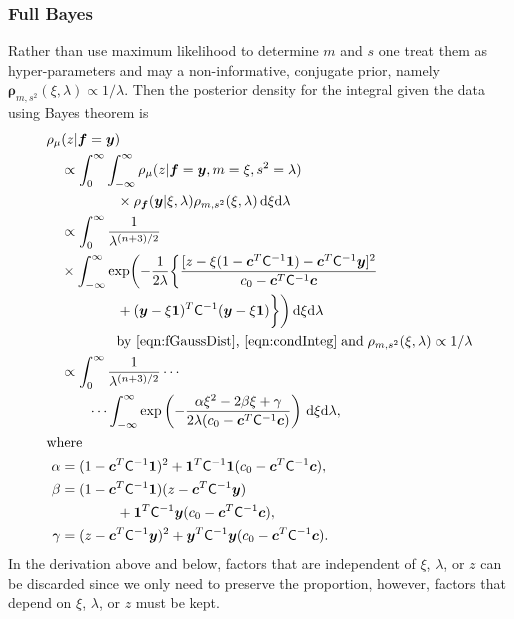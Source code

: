 \documentclass[twocolumn]{svjour3}          %
\newcommand{\bm}[1]{\boldsymbol{#1}}
\newcommand{\D}[1]{\text{d}{#1}}
\newcommand{\vc}{\bm{c}}
\newcommand{\vf}{\bm{f}}
\newcommand{\vrho}{\bm{\rho}}
\newcommand{\vy}{\bm{y}}
\newcommand{\vone}{\bm{1}}
\newcommand{\mC}{\mathsf{C}}
\begin{document}
\subsubsection{Full Bayes}

Rather than use maximum likelihood to determine $m$ and $s$ one treat them as hyper-parameters and may a non-informative, conjugate prior, namely $\vrho_{m,s^2}(\xi, \lambda) \propto 1/\lambda$. Then the posterior density for the integral given the data using Bayes theorem is
\begin{align*}
\MoveEqLeft[1]{\rho_{\mu}(z | \vf = \vy)} \\
& \propto \int_{0}^\infty \int_{-\infty}^\infty \rho_{\mu}(z | \vf = \vy, m = \xi, s^2 = \lambda) \\
& \qquad \qquad \times  \rho_{\vf}(\vy | \xi, \lambda ) \rho_{m, s^2}(\xi, \lambda) \, \D \xi \D \lambda \\
& \propto \displaystyle \int_{0}^\infty  \frac{1}{\lambda^{(n+3)/2}} \\
& \times \int_{-\infty}^\infty  \exp \biggl( -\frac{1}{2\lambda}\biggl\{
\frac{
[z - \xi (1 - \vc^T \mC^{-1} \vone)  -  \vc^T \mC^{-1} \vy]^2}
{c_0  -\vc ^T \mC^{-1} \vc}  \\
& \qquad \qquad  + (\vy - \xi \vone)^T \mC^{-1}(\vy - \xi \vone) \biggr \} \biggr) \, \D \xi \D \lambda \\
&\qquad \qquad
\text{by \eqref{eqn:fGaussDist}, \eqref{eqn:condInteg}} \; \text{and} \; \rho_{m,s^2}(\xi,\lambda) \propto 1/\lambda \\
& \propto \displaystyle \int_{0}^\infty  \frac{1}{\lambda^{(n+3)/2}} \cdots \\ & \qquad \cdots \int_{-\infty}^\infty  \exp\left( -\frac{\alpha \xi^2 -2 \beta \xi + \gamma}{2\lambda(c_0  -\vc ^T \mC^{-1} \vc)} \right) \, \D \xi \D \lambda, \\
\intertext{where}
\alpha & = (1 - \vc^T \mC^{-1} \vone)^2 + \vone^T \mC^{-1} \vone (c_0  -\vc ^T \mC^{-1} \vc),\\
\beta & =(1 - \vc^T \mC^{-1} \vone)(z - \vc^T \mC^{-1} \vy ) \\
& \qquad \qquad  + \vone^T \mC^{-1} \vy (c_0  -\vc ^T \mC^{-1} \vc),\\
\gamma &  = (z - \vc^T \mC^{-1} \vy )^2  + \vy^T \mC^{-1} \vy (c_0  -\vc ^T \mC^{-1} \vc).
\end{align*}
In the derivation above and below, factors that are independent of $\xi$, $\lambda$, or $z$ can be discarded since we only need to preserve the proportion, however, factors that depend on $\xi$, $\lambda$, or $z$ must be kept.  
\end{document}
